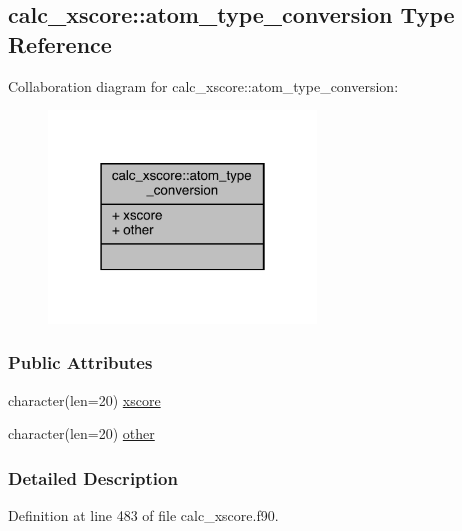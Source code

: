 \hypertarget{structcalc__xscore_1_1atom__type__conversion}{\subsection{calc\-\_\-xscore\-:\-:atom\-\_\-type\-\_\-conversion Type Reference}
\label{structcalc__xscore_1_1atom__type__conversion}
}


Collaboration diagram for calc\-\_\-xscore\-:\-:atom\-\_\-type\-\_\-conversion\-:
\nopagebreak
\begin{figure}[H]
\begin{center}
\leavevmode
\includegraphics[width=202pt]{structcalc__xscore_1_1atom__type__conversion__coll__graph}
\end{center}
\end{figure}
\subsubsection*{Public Attributes}
\begin{DoxyCompactItemize}
\item 
character(len=20) \hyperlink{structcalc__xscore_1_1atom__type__conversion_a87864904b96a20073f423b3809f1b89b}{xscore}
\item 
character(len=20) \hyperlink{structcalc__xscore_1_1atom__type__conversion_a4dbde22246ac6bcdd114cdb1aa521f3b}{other}
\end{DoxyCompactItemize}


\subsubsection{Detailed Description}


Definition at line 483 of file calc\-\_\-xscore.\-f90.



